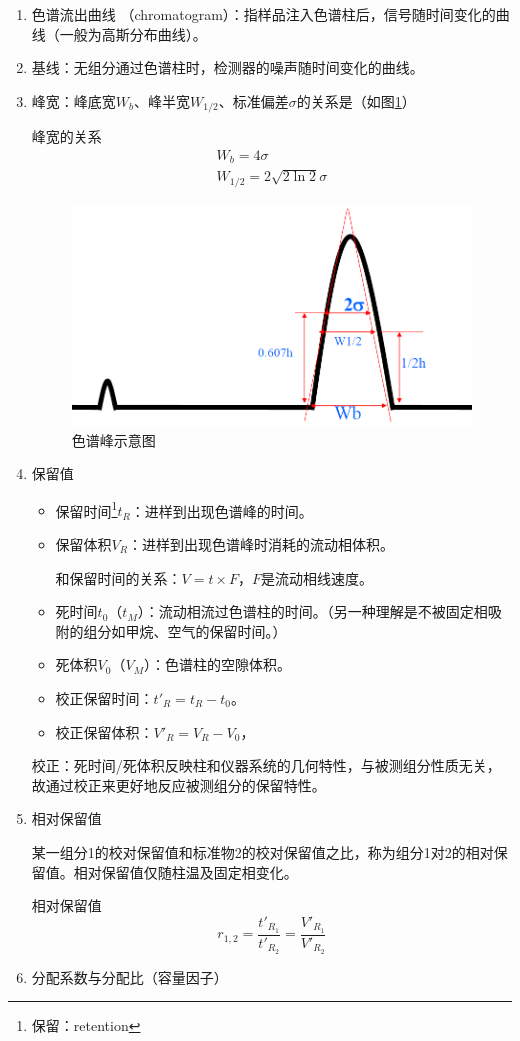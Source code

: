 \begin{enumerate}
	\item 色谱流出曲线 （chromatogram）：指样品注入色谱柱后，信号随时间变化的曲线（一般为高斯分布曲线）。
	\item 基线：无组分通过色谱柱时，检测器的噪声随时间变化的曲线。
	\item 峰宽：峰底宽$W_b$、峰半宽$W_{1/2}$、标准偏差$\sigma$的关系是（如图\ref{fig:chp1peak}）
	\begin{theorem*}{峰宽的关系}{}
		\begin{gather*}
		W_b=4\sigma\\
		W_{1/2}=2\sqrt{2\ln 2}\sigma
		\end{gather*}
	\end{theorem*}
	\begin{figure}[!h]
		\centering
		\includegraphics[width=0.55\linewidth]{image/chp1_peak}
		\caption{色谱峰示意图}
		\label{fig:chp1peak}
	\end{figure}
	\item 保留值
	\begin{itemize}
		\item 保留时间\footnote{保留：retention}$t_R$：进样到出现色谱峰的时间。
		\item 保留体积$V_R$：进样到出现色谱峰时消耗的流动相体积。
		
		和保留时间的关系：$V=t\times F$，$F$是流动相线速度。
		\item 死时间$t_0$（$t_M$）：流动相流过色谱柱的时间。（另一种理解是不被固定相吸附的组分如甲烷、空气的保留时间。）
		\item 死体积$V_0$（$V_M$）：色谱柱的空隙体积。
		\item 校正保留时间：$t'_R=t_R- t_0$。
		\item 校正保留体积：$V'_R=V_R- V_0$，
	\end{itemize}
		
	校正：死时间/死体积反映柱和仪器系统的几何特性，与被测组分性质无关，故通过校正来更好地反应被测组分的保留特性。
	\item 相对保留值
	
	某一组分1的校对保留值和标准物2的校对保留值之比，称为组分1对2的相对保留值。相对保留值仅随柱温及固定相变化。
	\begin{theorem*}{相对保留值}{}
		\begin{equation*}
			r_{1,2}=\dfrac{t'_{R_1}}{t'_{R_2}}=\dfrac{V'_{R_1}}{V'_{R_2}}
		\end{equation*}
	\end{theorem*}
	\item 分配系数与分配比（容量因子）
	

\end{enumerate}
